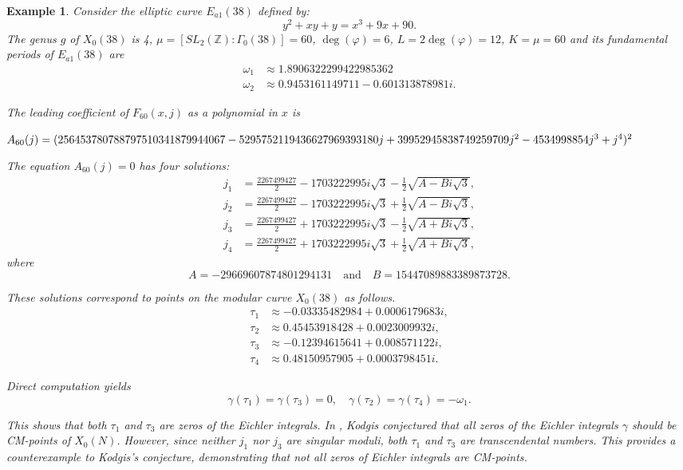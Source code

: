 \documentclass[10pt, a4paper]{article}
\newtheorem{example}[theorem]{Example}
\begin{document}
\begin{example}

Consider the elliptic curve $E_{a1}(38)$ defined by:
\[
y^2 + xy + y = x^3 + 9x + 90.
\]
The genus $g$ of $X_{0}(38)$  is 4,
$\mu = [SL_2(\mathbb{Z}):\Gamma_0(38)] = 60$,
 $\deg(\varphi) = 6$,
 $L = 2\deg(\varphi) = 12$, $K = \mu = 60$
  and its fundamental periods  of $E_{a1}(38)$ are
  \begin{align*}
    \omega_1 &\approx 1.8906322299422985362\\
    \omega_2 &\approx 0.9453161149711 - 0.601313878981i.
\end{align*}

The leading coefficient of $F_{60}(x,j)$ as a polynomial in $x$ is

$
A_{60}(j) = (256453780788797510341879944067 - 5295752119436627969393180j
+ \\
39952945838749259709j^2 - 4534998854j^3 + j^4)^2
$

The equation $A_{60}(j) = 0$ has four solutions:
\begin{align*}
j_1 &= \frac{2267499427}{2} - 1703222995i\sqrt{3} - \frac{1}{2}\sqrt{A-Bi\sqrt{3}}, \\
j_2 &= \frac{2267499427}{2} - 1703222995i\sqrt{3} + \frac{1}{2}\sqrt{A-Bi\sqrt{3}}, \\
j_3 &= \frac{2267499427}{2} + 1703222995i\sqrt{3} - \frac{1}{2}\sqrt{A+Bi\sqrt{3}}, \\
j_4 &= \frac{2267499427}{2} + 1703222995i\sqrt{3} + \frac{1}{2}\sqrt{A+Bi\sqrt{3}},
\end{align*}
where
\[
A = -29669607874801294131 \quad \text{and} \quad B = 15447089883389873728.
\]

These solutions correspond to points on the modular curve $X_0(38)$ as follows.
\begin{align*}
\tau_1 &\approx -0.03335482984 + 0.0006179683i, \\
\tau_2 &\approx 0.45453918428 + 0.0023009932i, \\
\tau_3 &\approx -0.12394615641 + 0.008571122i,\\
\tau_4 &\approx 0.48150957905 + 0.0003798451i.
\end{align*}

Direct computation yields
\[
\gamma(\tau_1) = \gamma(\tau_3) = 0, \quad \gamma(\tau_2) = \gamma(\tau_4) = -\omega_1.
\]

This shows that both $\tau_1$ and $\tau_3$ are zeros of the Eichler integrals. In \cite{Kodgis},
Kodgis conjectured that all zeros of the Eichler integrals $\gamma$  should be CM-points of $X_0(N)$.
However, since neither $j_1$ nor $j_3$ are singular moduli,
both $\tau_1$ and $\tau_3$ are transcendental numbers.
This provides a counterexample to Kodgis's conjecture, demonstrating that not all zeros of Eichler integrals are CM-points.
\end{example}
\end{document}

